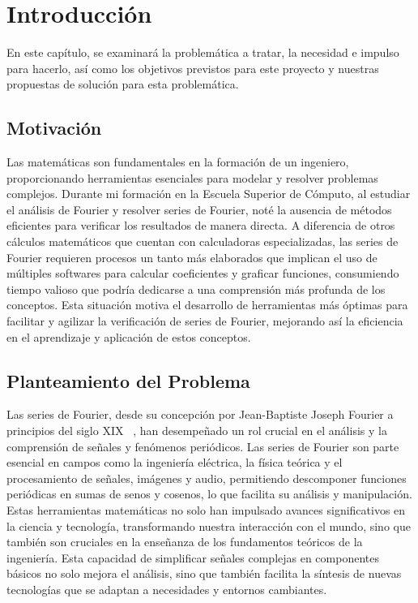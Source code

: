 \chapter{Introducción}\label{ch:Introducción}
En este capítulo, se examinará la problemática a tratar, la necesidad e impulso para hacerlo, así como los objetivos previstos para este proyecto y nuestras propuestas de solución para esta problemática. 

\section{Motivación}
Las matemáticas son fundamentales en la formación de un ingeniero, proporcionando herramientas esenciales para modelar y resolver problemas complejos. Durante mi formación en la Escuela Superior de Cómputo, al estudiar el análisis de Fourier y resolver series de Fourier, noté la ausencia de métodos eficientes para verificar los resultados de manera directa. A diferencia de otros cálculos matemáticos que cuentan con calculadoras especializadas, las series de Fourier requieren procesos un tanto más elaborados que implican el uso de múltiples softwares para calcular coeficientes y graficar funciones, consumiendo tiempo valioso que podría dedicarse a una comprensión más profunda de los conceptos. Esta situación motiva el desarrollo de herramientas más óptimas para facilitar y agilizar la verificación de series de Fourier, mejorando así la eficiencia en el aprendizaje y aplicación de estos conceptos.

\section{Planteamiento del Problema}
Las series de Fourier, desde su concepción por Jean-Baptiste Joseph Fourier a principios del siglo XIX ~\cite{almira2017fourier}, han desempeñado un rol crucial en el análisis y la comprensión de señales y fenómenos periódicos. Las series de Fourier son parte esencial en campos como la ingeniería eléctrica, la física teórica y el procesamiento de señales, imágenes y audio, permitiendo descomponer funciones periódicas en sumas de senos y cosenos, lo que facilita su análisis y manipulación. Estas herramientas matemáticas no solo han impulsado avances significativos en la ciencia y tecnología, transformando nuestra interacción con el mundo, sino que también son cruciales en la enseñanza de los fundamentos teóricos de la ingeniería. Esta capacidad de simplificar señales complejas en componentes básicos no solo mejora el análisis, sino que también facilita la síntesis de nuevas tecnologías que se adaptan a necesidades y entornos cambiantes.

